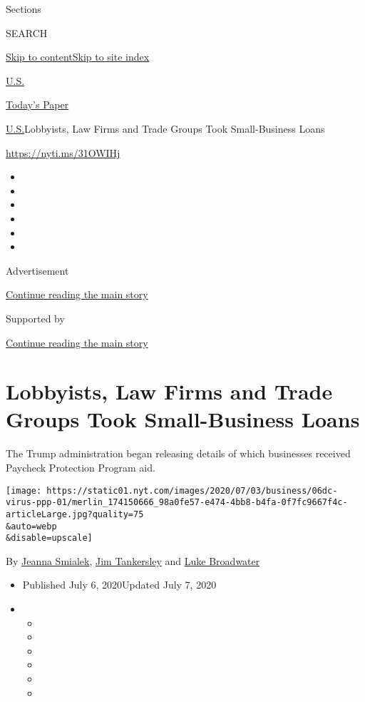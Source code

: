 Sections

SEARCH

\protect\hyperlink{site-content}{Skip to
content}\protect\hyperlink{site-index}{Skip to site index}

\href{https://www.nytimes.com/section/us}{U.S.}

\href{https://myaccount.nytimes.com/auth/login?response_type=cookie\&client_id=vi}{}

\href{https://www.nytimes.com/section/todayspaper}{Today's Paper}

\href{/section/us}{U.S.}\textbar{}Lobbyists, Law Firms and Trade Groups
Took Small-Business Loans

\url{https://nyti.ms/31OWIHj}

\begin{itemize}
\item
\item
\item
\item
\item
\item
\end{itemize}

Advertisement

\protect\hyperlink{after-top}{Continue reading the main story}

Supported by

\protect\hyperlink{after-sponsor}{Continue reading the main story}

\hypertarget{lobbyists-law-firms-and-trade-groups-took-small-business-loans}{%
\section{Lobbyists, Law Firms and Trade Groups Took Small-Business
Loans}\label{lobbyists-law-firms-and-trade-groups-took-small-business-loans}}

The Trump administration began releasing details of which businesses
received Paycheck Protection Program aid.

\texttt{[image: https://static01.nyt.com/images/2020/07/03/business/06dc-virus-ppp-01/merlin\_174150666\_98a0fe57-e474-4bb8-b4fa-0f7fc9667f4c-articleLarge.jpg?quality=75\\\&auto=webp\\\&disable=upscale]}

By \href{https://www.nytimes.com/by/jeanna-smialek}{Jeanna Smialek},
\href{https://www.nytimes.com/by/jim-tankersley}{Jim Tankersley} and
\href{https://www.nytimes.com/by/luke-broadwater}{Luke Broadwater}

\begin{itemize}
\item
  Published July 6, 2020Updated July 7, 2020
\item
  \begin{itemize}
  \item
  \item
  \item
  \item
  \item
  \item
  \end{itemize}
\end{itemize}

